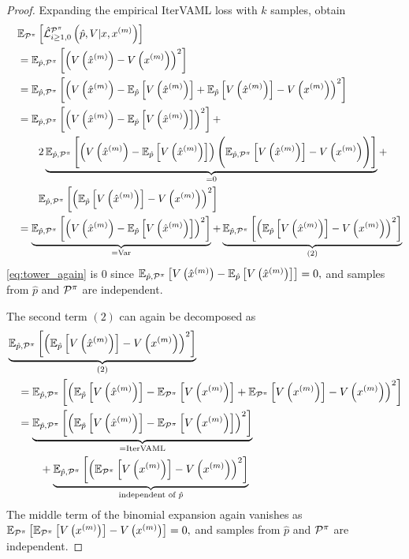 \begin{proof}
Expanding the empirical IterVAML loss with $k$ samples, obtain
\begin{align}
   & \EEX{\P^\pi}{\hat{\mathcal{L}}^{\P^\pi}_{i\geq1,0}\left(\hat{p},V|x,x^{(m)}\right)} \\
   \quad & =  \EEX{\hat{p},\P^\pi}{\left(\muV{m} - V\left(x^{(m)}\right)\right)^2} \\
   \quad & =  \EEX{\hat{p},\P^\pi}{\left(\muV{m} - \EEX{\hat{p}}{\muV{m}} + \EEX{\hat{p}}{\muV{m}} - V\left(x^{(m)}\right)\right)^2} \\
   \quad & =  \EEX{\hat{p},\P^\pi}{\left(\muV{m} - \EEX{\hat{p}}{V\left(\hat{x}^{(m)}\right)}\right)^2} + \\ 
   \quad &  \quad \quad  2 \underbrace{\EEX{\hat{p},\P^\pi}{\roundb{\muV{m} - \EEX{\hat{p}}{V\left(\hat{x}^{(m)}\right)}}\Biggl(\EEX{\hat{p},\P^\pi}{V\left(\hat{x}^{(m)}\right)} - V\left(x^{(m)}\right)\Biggr)}}_{=0} + \label{eq:tower_again}\\
   \quad &  \quad \quad  \EEX{\hat{p},\P^\pi}{\left(\EEX{\hat{p}}{V\left(\hat{x}^{(m)}\right)} - V\left(x^{(m)}\right)\right)^2}\\
   \quad & =  \underbrace{\EEX{\hat{p},\P^\pi}{\left(V\left(\hat{x}^{(m)}\right) - \EEX{\hat{p}}{V\left(\hat{x}^{(m)}\right)}\right)^2}}_{= \mathrm{Var}} + \underbrace{\EEX{\hat{p},\P^\pi}{\left(\EEX{\hat{p}}{V\left(\hat{x}^{(m)}\right)} - V\left(x^{(m)}\right)\right)^2}}_{(2)}
\end{align}
\autoref{eq:tower_again} is $0$ since $\EEX{\hat{p},\P^\pi}{\muV{m} - \EEX{\hat{p}}{V\left(\hat{x}^{(m)}\right)}} = 0,$ and samples from $\hat{p}$ and $\P^\pi$ are independent.

The second term $(2)$ can again be decomposed as
\begin{align}
   &\underbrace{\EEX{\hat{p},\P^\pi}{\left(\EEX{\hat{p}}{V\left(\hat{x}^{(m)}\right)} - V\left(x^{(m)}\right)\right)^2}}_{(2)} \\
   &\quad=\EEX{\hat{p},\P^\pi}{\left(\EEX{\hat{p}}{V\left(\hat{x}^{(m)}\right)} - \EEX{\P^\pi}{V\left(x^{(m)}\right)} + \EEX{\P^\pi}{V\left(x^{(m)}\right)} - V\left(x^{(m)}\right)\right)^2} \\
   &\quad=\underbrace{\EEX{\hat{p},\P^\pi}{\left(\EEX{\hat{p}}{V\left(\hat{x}^{(m)}\right)} - \EEX{\P^\pi}{V\left(x^{(m)}\right)}\right)^2}}_{= \mathrm{IterVAML}}\\
   &\quad \quad\quad + \underbrace{\EEX{\hat{p},\P^\pi}{\left(\EEX{\P^\pi}{V\left(x^{(m)}\right)} - V\left(x^{(m)}\right)\right)^2}}_{\text{independent of }\hat{p}}
\end{align}
The middle term of the binomial expansion again vanishes as $\EEX{\P^\pi}{\EEX{\P^\pi}{V\left(x^{(m)}\right)} - V\left(x^{(m)}\right)} \allowbreak = 0,$ and samples from $\hat{p}$ and $\P^\pi$ are independent.


\end{proof}
